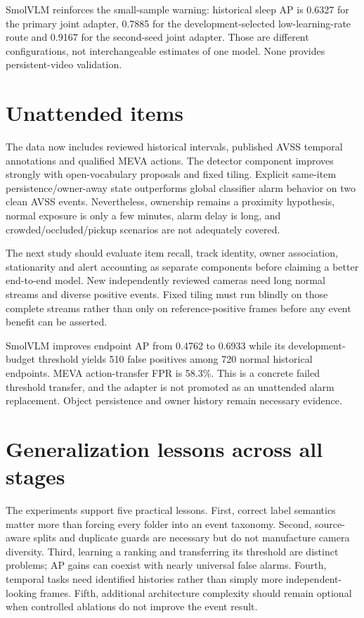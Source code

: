 SmolVLM reinforces the small-sample warning: historical sleep AP is 0.6327 for the primary joint adapter, 0.7885 for the development-selected low-learning-rate route and 0.9167 for the second-seed joint adapter. Those are different configurations, not interchangeable estimates of one model. None provides persistent-video validation.

\section{Unattended items}
The data now includes reviewed historical intervals, published AVSS temporal annotations and qualified MEVA actions. The detector component improves strongly with open-vocabulary proposals and fixed tiling. Explicit same-item persistence/owner-away state outperforms global classifier alarm behavior on two clean AVSS events. Nevertheless, ownership remains a proximity hypothesis, normal exposure is only a few minutes, alarm delay is long, and crowded/occluded/pickup scenarios are not adequately covered.

The next study should evaluate item recall, track identity, owner association, stationarity and alert accounting as separate components before claiming a better end-to-end model. New independently reviewed cameras need long normal streams and diverse positive events. Fixed tiling must run blindly on those complete streams rather than only on reference-positive frames before any event benefit can be asserted.

SmolVLM improves endpoint AP from 0.4762 to 0.6933 while its development-budget threshold yields 510 false positives among 720 normal historical endpoints. MEVA action-transfer FPR is 58.3\%. This is a concrete failed threshold transfer, and the adapter is not promoted as an unattended alarm replacement. Object persistence and owner history remain necessary evidence.

\section{Generalization lessons across all stages}
The experiments support five practical lessons. First, correct label semantics matter more than forcing every folder into an event taxonomy. Second, source-aware splits and duplicate guards are necessary but do not manufacture camera diversity. Third, learning a ranking and transferring its threshold are distinct problems; AP gains can coexist with nearly universal false alarms. Fourth, temporal tasks need identified histories rather than simply more independent-looking frames. Fifth, additional architecture complexity should remain optional when controlled ablations do not improve the event result.

